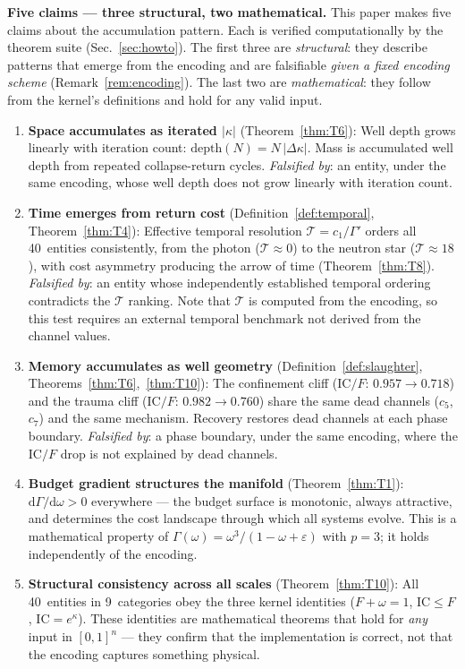\documentclass[
  aps,
  prd,
  twocolumn,
  superscriptaddress,
  nofootinbib,
  floatfix
]{revtex4-2}
\newcommand{\Gam}{\Gamma}
\newcommand{\eps}{\varepsilon}
\newcommand{\dd}{\mathrm{d}}
\newcommand{\IC}{\mathrm{IC}}
\begin{document}
\textbf{Five claims --- three structural, two mathematical.}
This paper makes five claims about the accumulation pattern.
Each is verified computationally by the theorem suite
(Sec.~\ref{sec:howto}).  The first three are
\emph{structural}: they describe patterns that emerge from
the encoding and are falsifiable \emph{given a fixed
encoding scheme} (Remark~\ref{rem:encoding}).  The last two
are \emph{mathematical}: they follow from the kernel's
definitions and hold for any valid input.
\begin{enumerate}
\item \textbf{Space accumulates as iterated $|\kappa|$}
  (Theorem~\ref{thm:T6}):
  Well depth grows linearly with iteration count:
  $\mathrm{depth}(N) = N\,|\Delta\kappa|$.  Mass is
  accumulated well depth from repeated collapse-return
  cycles.
  \emph{Falsified by}: an entity, under the same encoding,
  whose well depth does not grow linearly with iteration
  count.
\item \textbf{Time emerges from return cost}
  (Definition~\ref{def:temporal}, Theorem~\ref{thm:T4}):
  Effective temporal resolution $\mathcal{T} = c_1/\Gam'$
  orders all 40~entities consistently, from the photon
  ($\mathcal{T} \approx 0$) to the neutron star ($\mathcal{T}
  \approx 18$), with cost asymmetry producing the arrow of
  time (Theorem~\ref{thm:T8}).
  \emph{Falsified by}: an entity whose independently
  established temporal ordering contradicts the
  $\mathcal{T}$ ranking.  Note that $\mathcal{T}$ is computed
  from the encoding, so this test requires an external
  temporal benchmark not derived from the channel values.
\item \textbf{Memory accumulates as well geometry}
  (Definition~\ref{def:slaughter},
  Theorems~\ref{thm:T6},~\ref{thm:T10}):
  The confinement cliff ($\IC/F$: $0.957 \to 0.718$) and
  the trauma cliff ($\IC/F$: $0.982 \to 0.760$) share the
  same dead channels ($c_5$, $c_7$) and the same mechanism.
  Recovery restores dead channels at each phase boundary.
  \emph{Falsified by}: a phase boundary, under the same
  encoding, where the $\IC/F$ drop is not explained by
  dead channels.
\item \textbf{Budget gradient structures the manifold}
  (Theorem~\ref{thm:T1}):
  $\dd\Gam/\dd\omega > 0$ everywhere --- the budget surface
  is monotonic, always attractive, and determines the cost
  landscape through which all systems evolve.
  This is a mathematical property of $\Gam(\omega) =
  \omega^3/(1 - \omega + \eps)$ with $p = 3$; it holds
  independently of the encoding.
\item \textbf{Structural consistency across all scales}
  (Theorem~\ref{thm:T10}):
  All 40~entities in 9~categories obey the three kernel
  identities ($F + \omega = 1$, $\IC \leq F$,
  $\IC = e^{\kappa}$).  These identities are mathematical
  theorems that hold for \emph{any} input in $[0,1]^n$ ---
  they confirm that the implementation is correct, not that
  the encoding captures something physical.
\end{enumerate}
\end{document}
